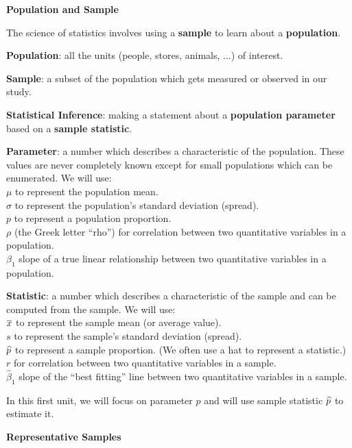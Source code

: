 \def\theTopic{Reading 2}

\begin{center}
{\bf {\large Population and Sample}}
\end{center}

The science of statistics involves using a {\bf sample} to learn about
a {\bf population}.

{\bf Population}: all the units (people, stores, animals, ...) of
interest.

{\bf Sample}:  a subset of the population which gets measured or
observed in our study.

{\bf Statistical  Inference}: making a statement about a
{\bf population parameter} based on a {\bf  sample statistic}.

{\bf Parameter}:  a number which describes a characteristic of the
population. These values are never completely known except for small
populations which can be enumerated. We will use:\\
  $\mu$ to represent the population mean.\\
  $\sigma$ to represent the population's standard deviation
  (spread).\\
  $p$  to represent a population proportion.\\
  $\rho$ (the Greek letter ``rho'') for correlation between two
  quantitative variables in a population.\\
  $\beta_1$ slope of a true linear relationship between  two
  quantitative variables in a population.

{\bf Statistic}:  a number which describes a characteristic of the
sample and can be computed from the sample. We will use:\\
  $\overline{x}$ to represent the sample mean (or average value).\\
  $s$  to represent the sample's standard deviation
  (spread).\\
  $\widehat{p}$  to represent a sample proportion.  (We often use a hat to
  represent a statistic.)\\
  $r$  for correlation between two  quantitative variables in a sample.\\
  $\widehat{\beta}_1$ slope of the ``best fitting'' line  between  two
  quantitative variables in a sample.

In this first unit, we will focus on parameter $p$ and will use sample
statistic $\widehat{p}$ to estimate it.

\begin{center}
  {\bf Representative Samples}
\end{center}

